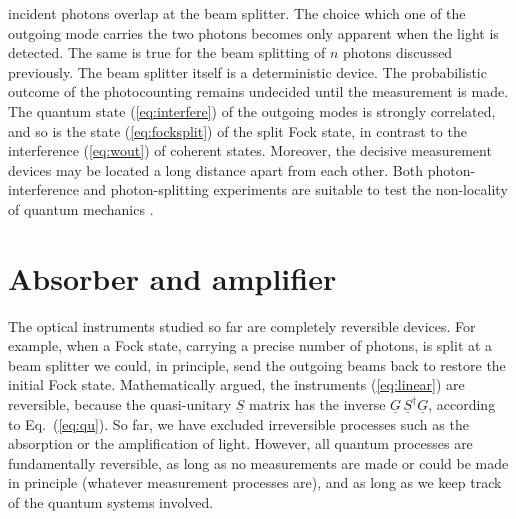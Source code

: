 \documentclass[12pt,amsmath,amssymb]{article}
\numberwithin{equation}{section}
\begin{document}
incident photons overlap at the beam splitter. The choice which
one of the outgoing mode carries the two photons becomes only
apparent when the light is detected. The same is true for the beam
splitting of $n$ photons discussed previously. The beam splitter
itself is a deterministic device. The probabilistic outcome of the
photocounting remains undecided until the measurement is made.
The quantum state (\ref{eq:interfere}) of the outgoing modes is
strongly correlated, and so is the state (\ref{eq:focksplit}) of
the split Fock state, in contrast to the interference
(\ref{eq:wout}) of coherent states. Moreover, the decisive
measurement devices may be located a long distance apart from
each other. Both photon-interference and photon-splitting
experiments are suitable \cite{Tan,Hardy} to test the
non-locality of quantum mechanics \cite{Bell,EPR}.

\section{Absorber and amplifier}

The optical instruments studied so far are completely reversible
devices. For example, when a Fock state, carrying a precise
number of photons, is split at a beam splitter we could, in
principle, send the outgoing beams back to restore the initial
Fock state. Mathematically argued, the instruments
(\ref{eq:linear}) are reversible, because the quasi-unitary
$\underline{S}$ matrix has the inverse
$\underline{G}\,\underline{S}^\dagger \underline{G}$, according
to Eq.\ (\ref{eq:qu}). So far, we have excluded irreversible
processes such as the absorption or the amplification of light.
However, all quantum processes are fundamentally
reversible, as long as no measurements are made or could be made
in principle (whatever measurement processes are), and as long as
we keep track of the quantum systems involved.
\end{document}
